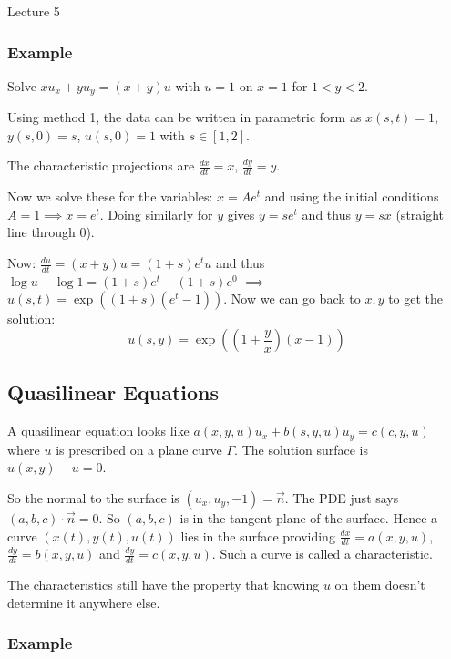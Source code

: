 \begin{center}

Lecture 5

\end{center}

\subsubsection*{Example}

Solve $xu_x + yu_y = (x+y)u$ with $u=1$ on $x=1$ for $1<y<2$.

\vspace{\baselineskip}

Using method 1, the data can be written in parametric form as $x(s,t) = 1$, $y(s,0) = s$, $u(s,0)=1$ with $s \in [1,2]$.

The characteristic projections are $\frac{dx}{dt} = x$, $\frac{dy}{dt} = y$.

Now we solve these for the variables: $x = A e^t$ and using the initial conditions $A=1 \implies x = e^t$. Doing similarly for $y$ gives $y = s e^t$ and thus $y = sx$ (straight line through 0).

Now: $\frac{du}{dt} = (x+y)u = (1+s) e^t u$ and thus $\log u - \log 1 = (1+s)e^t - (1+s)e^0$ $\implies$ $u(s,t) = \exp \left( (1+s) (e^t -1)\right)$. Now we can go back to $x,y$ to get the solution: $$u(s,y) = \exp \left(\left(1 + \frac{y}{x}\right)(x-1)\right)$$

\subsection{Quasilinear Equations}

A quasilinear equation looks like $a(x,y,u)u_x + b(s,y,u)u_y = c(c,y,u)$ where $u$ is prescribed on a plane curve $\Gamma$. The solution surface is $u(x,y) - u = 0$.

So the normal to the surface is $(u_x, u_y, -1) = \vec{n}$. The PDE just says $(a,b,c) \cdot \vec{n} = 0$. So $(a,b,c)$ is in the tangent plane of the surface. Hence a curve $(x(t), y(t), u(t))$ lies in the surface providing $\frac{dx}{dt} = a(x,y,u)$, $\frac{dy}{dt} = b(x,y,u)$ and $\frac{dy}{dt} = c(x,y,u)$. Such a curve is called a characteristic.

The characteristics still have the property that knowing $u$ on them doesn't determine it anywhere else.

\subsubsection*{Example}

